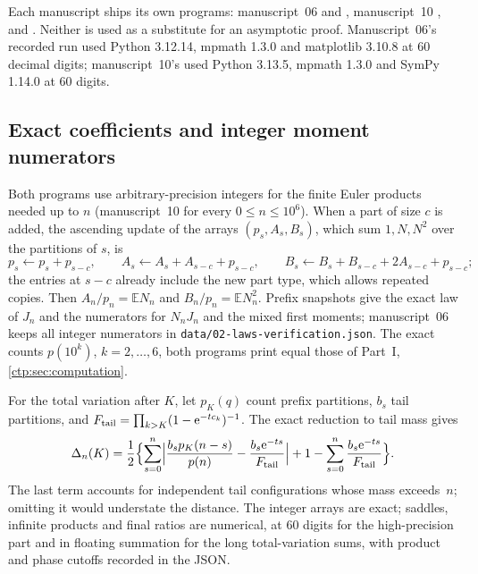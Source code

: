 \documentclass[11pt,a4paper]{article}
\numberwithin{equation}{section}
\theoremstyle{definition}
\theoremstyle{remark}
\newcommand{\e}{\mathrm e}
\newcommand{\E}{\mathbb E}
\begin{document}
Each manuscript ships its own programs: manuscript~06
 and ,
manuscript~10 ,
 and .
Neither is used as a substitute for an asymptotic proof. Manuscript~06's
recorded run used Python 3.12.14, mpmath 1.3.0 and matplotlib 3.10.8 at 60
decimal digits; manuscript~10's used Python 3.13.5, mpmath 1.3.0 and SymPy
1.14.0 at 60 digits.

\subsection{Exact coefficients and integer moment numerators}
Both programs use arbitrary-precision integers for the finite Euler products
needed up to $n$ (manuscript~10 for every $0\le n\le10^6$). When a part of
size $c$ is added, the ascending update of the arrays $(p_s,A_s,B_s)$, which
sum $1,N,N^2$ over the partitions of $s$, is
\[
 p_s\gets p_s+p_{s-c},\qquad A_s\gets A_s+A_{s-c}+p_{s-c},\qquad
 B_s\gets B_s+B_{s-c}+2A_{s-c}+p_{s-c};
\]
the entries at $s-c$ already include the new part type, which allows
repeated copies. Then $A_n/p_n=\E N_n$ and $B_n/p_n=\E N_n^2$. Prefix
snapshots give the exact law of $J_n$ and the numerators for $N_nJ_n$ and the
mixed first moments; manuscript~06 keeps all integer numerators in
\texttt{data/02-laws-verification.json}. The exact counts $p(10^k)$,
$k=2,\ldots,6$, both programs print equal those of Part~I,
\cref{ctp:sec:computation}.

For the total variation after $K$, let $p_K(q)$ count prefix partitions,
$b_s$ tail partitions, and
$F_{\rm tail}=\prod_{k>K}(1-\e^{-tc_k})^{-1}$. The exact reduction to tail
mass gives
\begin{equation}\label{ctp:cl:eq:numerictv}
 \Delta_n(K)=\frac12\Bigl\{\sum_{s=0}^n\Bigl|\frac{b_sp_K(n-s)}{p(n)}
 -\frac{b_s\e^{-ts}}{F_{\rm tail}}\Bigr|+1-\sum_{s=0}^n\frac{b_s\e^{-ts}}{F_{\rm tail}}\Bigr\}.
\end{equation}
The last term accounts for independent tail configurations whose mass
exceeds~$n$; omitting it would understate the distance. The integer arrays
are exact; saddles, infinite products and final ratios are numerical, at 60
digits for the high-precision part and in floating summation for the long
total-variation sums, with product and phase cutoffs recorded in the JSON.

\begin{table}[htbp]
\centering\small

\caption{Exact integer count and moment numerators at the numerical saddle
(manuscript~06; $N$ is $N_n$, $J$ is $J_n$). The limits of the last three
columns are $S_1=1.80613305\ldots$, $S_2=1.29573230\ldots$ and zero
(\cref{ctp:cl:thm:mixedcov} gives the rate of the last). The variance
converges slowly, as \cref{ctp:cl:cor:var} predicts.}
\label{ctp:cl:tab:moments}
\end{table}
\end{document}
